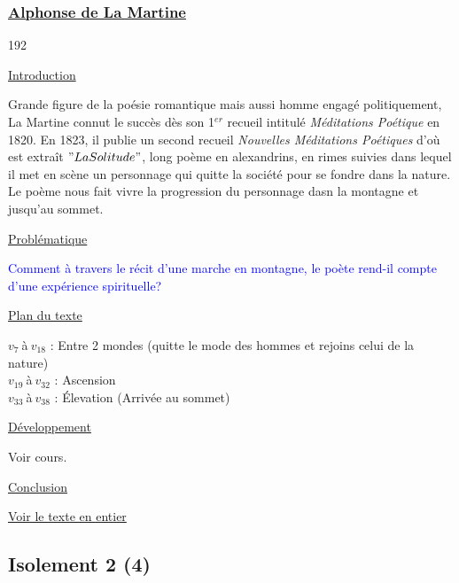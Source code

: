 \documentclass[12pt,a4paper]{article}
\begin{document}
			\subsubsection{\href{.extra/Bio/La_Martine.pdf}{Alphonse de La Martine}}
\begin{dingautolist}{192}

\item \underline{Introduction} \par
		Grande figure de la po\'esie romantique mais aussi homme engag\'e politiquement, La Martine connut le succ\`es d\`es son 1$^{er}$ recueil intitul\'e \textit{M\'editations Po\'etique} en 1820. 
		En 1823, il publie un second recueil \textit{Nouvelles M\'editations Po\'etiques} d'o\`u est extra\^it $"La Solitude"$, 
		long po\`eme en alexandrins, en rimes suivies dans lequel il met en sc\`ene un personnage qui quitte la soci\'et\'e pour se fondre dans la nature. 
		Le po\`eme nous fait vivre la progression du personnage dasn la montagne et jusqu'au sommet.

\item \underline{Probl\'ematique }\par
		\textcolor{blue}{Comment \`a travers le r\'ecit d'une marche en montagne, le po\`ete rend-il compte d'une expérience spirituelle?}

\item \underline{Plan du texte} \par
		$v_{7}~$\`a$~v_{18}$ : Entre 2 mondes (quitte le mode des hommes et rejoins celui de la nature)\\
		$v_{19}~$\`a$~v_{32}$ : Ascension\\
		$v_{33}~$\`a$~v_{38}$ : \'Elevation (Arriv\'ee au sommet)

\item \underline{D\'eveloppement} \par
		Voir cours.

\item \underline{Conclusion} \par


\end{dingautolist}
\href{.extra/Textes/Solitude.pdf}{Voir le texte en entier}
 \newpage

			\subsection{Isolement 2 (4)}
\end{document}
